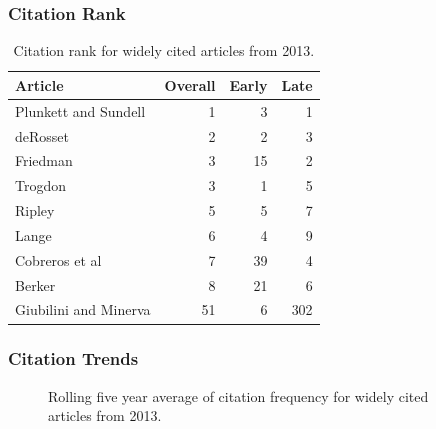 \documentclass[
  10pt,
  letterpaper,
  DIV=11,
  numbers=noendperiod,
  twoside]{scrartcl}
\begin{document}
\subsubsection*{Citation Rank}\label{sec-rank-2013}

\begin{longtable}[]{@{}lrrr@{}}

\caption{\label{tbl-citation-rank-2013}Citation rank for widely cited
articles from 2013.}

\tabularnewline

\toprule\noalign{}
Article & Overall & Early & Late \\
\midrule\noalign{}
\endhead
\bottomrule\noalign{}
\endlastfoot
Plunkett and Sundell & 1 & 3 & 1 \\
deRosset & 2 & 2 & 3 \\
Friedman & 3 & 15 & 2 \\
Trogdon & 3 & 1 & 5 \\
Ripley & 5 & 5 & 7 \\
Lange & 6 & 4 & 9 \\
Cobreros et al & 7 & 39 & 4 \\
Berker & 8 & 21 & 6 \\
Giubilini and Minerva & 51 & 6 & 302 \\

\end{longtable}

\subsubsection*{Citation Trends}\label{sec-trends-2013}

\begin{figure}


\caption{\label{fig-citation-spaghetti-2013}Rolling five year average of
citation frequency for widely cited articles from 2013.}

\end{figure}%
\end{document}
